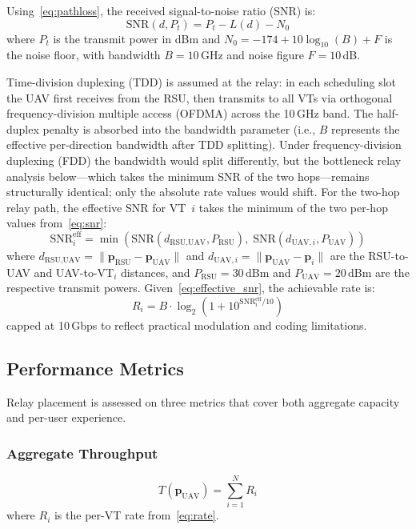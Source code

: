 \documentclass[journal]{IEEEtran}
\begin{document}
Using~\eqref{eq:pathloss}, the received signal-to-noise ratio (SNR) is:
\begin{equation}
    \text{SNR}(d, P_t) = P_t - L(d) - N_0
    \label{eq:snr}
\end{equation}
where $P_t$ is the transmit power in dBm and $N_0 = -174 + 10\log_{10}(B) + F$ is the noise floor, with bandwidth $B = 10$\,GHz and noise figure $F = 10$\,dB.

Time-division duplexing (TDD) is assumed at the relay: in each scheduling slot the UAV first receives from the RSU, then transmits to all VTs via orthogonal frequency-division multiple access (OFDMA) across the 10\,GHz band. The half-duplex penalty is absorbed into the bandwidth parameter (i.e., $B$ represents the effective per-direction bandwidth after TDD splitting). Under frequency-division duplexing (FDD) the bandwidth would split differently, but the bottleneck relay analysis below---which takes the minimum SNR of the two hops---remains structurally identical; only the absolute rate values would shift. For the two-hop relay path, the effective SNR for VT~$i$ takes the minimum of the two per-hop values from~\eqref{eq:snr}:
\begin{equation}
    \text{SNR}_i^\text{eff} = \min\!\left(\text{SNR}(d_{\text{RSU},\text{UAV}}, P_\text{RSU}),\; \text{SNR}(d_{\text{UAV},i}, P_\text{UAV})\right)
    \label{eq:effective_snr}
\end{equation}
where $d_{\text{RSU},\text{UAV}} = \|\mathbf{p}_\text{RSU} - \mathbf{p}_\text{UAV}\|$ and $d_{\text{UAV},i} = \|\mathbf{p}_\text{UAV} - \mathbf{p}_i\|$ are the RSU-to-UAV and UAV-to-VT$_i$ distances, and $P_\text{RSU} = 30$\,dBm and $P_\text{UAV} = 20$\,dBm are the respective transmit powers. Given~\eqref{eq:effective_snr}, the achievable rate is:
\begin{equation}
    R_i = B \cdot \log_2\!\left(1 + 10^{\text{SNR}_i^\text{eff}/10}\right)
    \label{eq:rate}
\end{equation}
capped at 10\,Gbps to reflect practical modulation and coding limitations.

\subsection{Performance Metrics}

Relay placement is assessed on three metrics that cover both aggregate capacity and per-user experience.

\subsubsection{Aggregate Throughput}
\begin{equation}
    T(\mathbf{p}_\text{UAV}) = \sum_{i=1}^{N} R_i
\end{equation}
where $R_i$ is the per-VT rate from~\eqref{eq:rate}.
\end{document}
